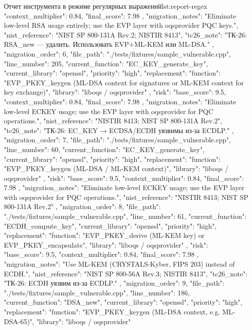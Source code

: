 \documentclass{itmo-vkr}
\begin{document}
\begin{itmolisting}[JSON]{Отчет инструмента в режиме регулярных выражений}{lst:report-regex}
{{{				"context_multiplier": 0.84,
				"final_score": 7.98
			},
			"migration_notes": "Eliminate low-level RSA usage entirely; use the EVP layer with oqsprovider PQC keys.",
			"nist_reference": "NIST SP 800-131A Rev.2; NISTIR 8413",
			"tc26_note": "ТК-26: RSA_new — удалить. Использовать EVP+ML-KEM или ML-DSA."
		},
		{
			"migration_order": 6,
			"file_path": "./tests/fixtures/sample_vulnerable.cpp",
			"line_number": 205,
			"current_function": "EC_KEY_generate_key",
			"current_library": "openssl",
			"priority": "high",
			"replacement": {
				"function": "EVP_PKEY_keygen (ML-DSA context for signatures or ML-KEM context for key exchange)",
				"library": "liboqs / oqsprovider"
			},
			"risk": {
				"base_score": 9.5,
				"context_multiplier": 0.84,
				"final_score": 7.98
			},
			"migration_notes": "Eliminate low-level ECKEY usage; use the EVP layer with oqsprovider for PQC operations.",
			"nist_reference": "NISTIR 8413; NIST SP 800-131A Rev.2",
			"tc26_note": "ТК-26: EC_KEY → ECDSA/ECDH уязвимы из-за ECDLP."
		},
		{
			"migration_order": 7,
			"file_path": "./tests/fixtures/sample_vulnerable.cpp",
			"line_number": 60,
			"current_function": "EC_KEY_generate_key",
			"current_library": "openssl",
			"priority": "high",
			"replacement": {
				"function": "EVP_PKEY_keygen (ML-DSA / ML-KEM context)",
				"library": "liboqs / oqsprovider"
			},
			"risk": {
				"base_score": 9.5,
				"context_multiplier": 0.84,
				"final_score": 7.98
			},
			"migration_notes": "Eliminate low-level ECKEY usage; use the EVP layer with oqsprovider for PQC operations.",
			"nist_reference": "NISTIR 8413; NIST SP 800-131A Rev.2"
		},
		{
			"migration_order": 8,
			"file_path": "./tests/fixtures/sample_vulnerable.cpp",
			"line_number": 61,
			"current_function": "ECDH_compute_key",
			"current_library": "openssl",
			"priority": "high",
			"replacement": {
				"function": "EVP_PKEY_derive (ML-KEM key) or EVP_PKEY_encapsulate",
				"library": "liboqs / oqsprovider"
			},
			"risk": {
				"base_score": 9.5,
				"context_multiplier": 0.84,
				"final_score": 7.98
			},
			"migration_notes": "Use ML-KEM (CRYSTALS-Kyber, FIPS 203) instead of ECDH.",
			"nist_reference": "NIST SP 800-56A Rev.3; NISTIR 8413",
			"tc26_note": "ТК-26: ECDH уязвим из-за ECDLP."
		},
		{
			"migration_order": 9,
			"file_path": "./tests/fixtures/sample_vulnerable.cpp",
			"line_number": 186,
			"current_function": "DSA_new",
			"current_library": "openssl",
			"priority": "high",
			"replacement": {
				"function": "EVP_PKEY_keygen (ML-DSA context, e.g. ML-DSA-65)",
				"library": "liboqs / oqsprovider"
}}}
\end{itmolisting}
\end{document}
